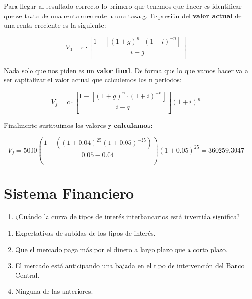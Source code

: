 \documentclass[
  letterpaper,
  DIV=11,
  numbers=noendperiod]{scrreprt}
\providecommand{\tightlist}{%
  \setlength{\itemsep}{0pt}\setlength{\parskip}{0pt}}\usepackage{longtable,booktabs,array}
\begin{document}
Para llegar al resultado correcto lo primero que tenemos que hacer es
identificar que se trata de una renta creciente a una tasa g. Expresión
del \textbf{valor actual} de una renta creciente es la siguiente:

\[V_0=c\cdot \left[\frac{1-\left[\left(1+g\right)^n\cdot \left(1+i\right)^{-n}\right]}{i-g}\right]\]

Nada solo que nos piden es un \textbf{valor final}. De forma que lo que
vamos hacer va a ser capitalizar el valor actual que calculemos los n
periodos:

\[V_f=c\cdot \left[\frac{1-\left[\left(1+g\right)^n\cdot \left(1+i\right)^{-n}\right]}{i-g}\right]\left(1+i\right)^n\]

Finalmente sustituimos los valores y \textbf{calculamos}:

\[V_f=5000\left(\frac{1-\left(\left(1+0.04\right)^{25}\left(1+0.05\right)^{-25}\right)}{0.05-0.04}\right)\left(1+0.05\right)^{25}=360259.3047\]

\hypertarget{sistema-financiero}{%
\section*{Sistema Financiero}\label{sistema-financiero}}


\begin{enumerate}
\def\labelenumi{\arabic{enumi}.}
\tightlist
\item
  ¿Cuándo la curva de tipos de interés interbancarios está invertida
  significa?
\end{enumerate}

\begin{enumerate}
\def\labelenumi{\alph{enumi})}
\item
  Expectativas de subidas de los tipos de interés.
\item
  Que el mercado paga más por el dinero a largo plazo que a corto plazo.
\item
  El mercado está anticipando una bajada en el tipo de intervención del
  Banco Central.
\item
  Ninguna de las anteriores.
\end{enumerate}
\end{document}
